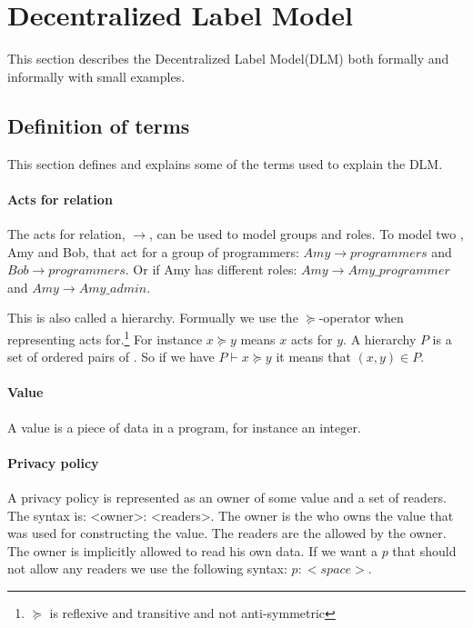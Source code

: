 \section{Decentralized Label Model}
\newcommand{\xvalue}{value}
\newcommand{\xvalues}{values}
This section describes the Decentralized Label Model(DLM) both formally and informally with small examples.

\subsection{Definition of terms}
This section defines and explains some of the terms used to explain the DLM.

\paragraph{Acts for relation}
The acts for relation, $\rightarrow$, can be used to model groups and roles.
To model two \principals{}, Amy and Bob, that act for a group of programmers: $Amy \rightarrow programmers$ and $Bob \rightarrow programmers$.
Or if Amy has different roles: $Amy \rightarrow Amy\_programmer$ and $Amy \rightarrow Amy\_admin$.

This is also called a \principal{} hierarchy.
Formually we use the $\succeq$-operator when representing acts for.\footnote{$\succeq$ is reflexive and transitive and not anti-symmetric}
For instance $x \succeq y$ means $x$ acts for $y$.
A \principal{} hierarchy $P$ is a set of ordered pairs of \principals{}.
So if we have $P \vdash x \succeq y$ it means that $(x,y) \in P$.

\paragraph{Value}
A \xvalue{} is a piece of data in a program, for instance an integer.

\paragraph{Privacy policy}
A privacy policy is represented as an owner of some \xvalue{} and a set of readers.
The syntax is: <owner>: <readers>.
The owner is the \principal{} who owns the \xvalue{} that was used for constructing the \xvalue{}.
The readers are the \principals{} allowed by the owner.
The owner is implicitly allowed to read his own data.
If we want a \principal{} $p$ that should not allow any readers we use the following syntax: $p: <space> $.

